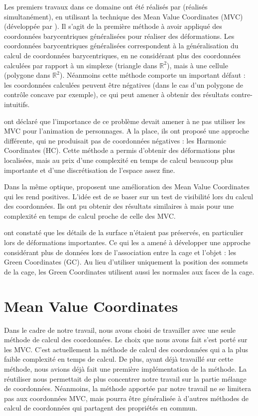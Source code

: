 Les premiers travaux dans ce domaine ont été réalisés par \cite{JSW05}
\cite{FKR05} (réalisés simultanément), en utilisant la technique des
Mean Value Coordinates (MVC) (développée par \cite{Flo03}). Il s'agit de la
première méthode à avoir appliqué des coordonnées barycentriques généralisées
pour réaliser des déformations. Les coordonnées barycentriques généralisées
correspondent à la généralisation du calcul de coordonnées barycentriques, en ne
considérant plus des coordonnées calculées par rapport à un simplexe (triangle
dans $\mathbb{R}^2$), mais à une cellule (polygone dans $\mathbb{R}^2$).
Néanmoins cette méthode comporte un important défaut : les coordonnées calculées
peuvent être négatives (dans le cas d'un polygone de contrôle concave par
exemple), ce qui peut amener à obtenir des résultats contre-intuitifs.

\cite{JMDGS07} ont déclaré que l'importance de ce problème devait amener à ne
pas utiliser les MVC pour l'animation de personnages. A la place, ils ont
proposé une approche différente, qui ne produisait pas de coordonnées négatives
: les Harmonic Coordinates (HC). Cette méthode a permis d'obtenir des
déformations plus localisées, mais au prix d'une complexité en temps de calcul
beaucoup plus importante et d'une discrétisation de l'espace assez fine.

Dans la même optique, \cite{LKCL07} proposent une amélioration des Mean Value
Coordinates qui les rend positives. L'idée est de se baser sur un test de
visibilité lors du calcul des coordonnées. Ils ont pu obtenir des résultats
similaires à \cite{JMDGS07} mais pour une complexité en temps de calcul proche
de celle des MVC.

\cite{LLC08} ont constaté que les détails de la surface n'étaient pas préservés,
en particulier lors de déformations importantes. Ce qui les a amené à développer
une approche considérant plus de données lors de l'association entre la cage et
l'objet : les Green Coordinates (GC). Au lieu d'utiliser uniquement la position
des sommets de la cage, les Green Coordinates utilisent aussi les normales aux
faces de la cage.

\section{Mean Value Coordinates}

Dans le cadre de notre travail, nous avons choisi de travailler avec une seule
méthode de calcul des coordonnées. Le choix que nous avons fait s'est porté
sur les MVC. C'est actuellement la méthode de calcul des coordonnées qui a la
plus faible complexité en temps de calcul. De plus, ayant déjà travaillé sur
cette méthode, nous avions déjà fait une première implémentation de la
méthode. La réutiliser nous permettait de plus concentrer notre travail sur la
partie mélange de coordonnées. Néanmoins, la méthode apportée par notre
travail ne se limitera pas aux coordonnées MVC, mais pourra être généralisée à
d'autres méthodes de calcul de coordonnées qui partagent des propriétés en
commun.

